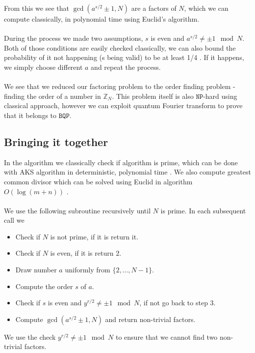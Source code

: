 From this we see that $\gcd(a^{s/2}\pm 1,N)$ are a factors of $N$, which we can compute classically, in polynomial time using Euclid's algorithm.\\\\
During the process we made two assumptions, $s$ is even and $a^{s/2}\neq \pm 1 \mod{N}$. Both of those conditions are easily checked classically, we can also bound the probability of it not happening (s being valid) to be at least 1/4 \cite{thebook}. If it happens, we simply choose different $a$ and repeat the process. 
\\\\
We see that we reduced our factoring problem to the order finding problem - finding the order of a number in $\mathbb{Z}_N$. This problem itself is also $\mathtt{NP}$-hard using classical approach, however we can exploit quantum Fourier transform to prove that it belongs to $\mathtt{BQP}$.


\subsection{Bringing it together}
In the algorithm we classically check if algorithm is prime, which can be done with AKS algorithm in deterministic, polynomial time \cite{Agrawal2004}. We also compute greatest common divisor which can be solved using Euclid in algorithm $O(\log{(m+n)})$ \cite{cormen2009}.
\\\\
We use the following subroutine recursively until $N$ is prime. In each subsequent call we 
\begin{itemize}
    \item Check if $N$ is not prime, if it is return it.
    \item Check if $N$ is even, if it is return $2$.
    \item Draw number $a$ uniformly from $\{2, \dots, N-1\}$.
    \item Compute the order $s$ of $a$.
    \item Check if $s$ is even and $y^{r/2}\neq \pm1 \mod N$, if not go back to step 3.
    \item Compute $\gcd(a^{s/2}\pm 1,N)$ and return non-trivial factors.
\end{itemize}
We use the check $y^{r/2}\neq \pm1 \mod N$ to ensure that we cannot find two non-trivial factors.\\
